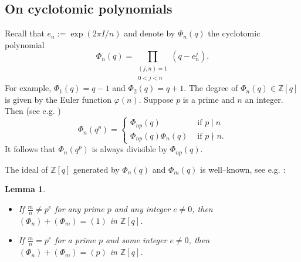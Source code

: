 \documentclass[12pt]{amsart}
\theoremstyle{plain}
\newtheorem{lemma}[Thm]{Lemma}
\theoremstyle{definition}
\def\BZ{\mathbb Z}
\def\BQ{\mathbb Q}
\def\Z{\BZ}
\def\Q{\BQ}
\begin{document}
\subsection{On cyclotomic polynomials}
Recall that $e_n := \exp(2\pi I/n)$
and denote by
$\Phi_n(q)$ the cyclotomic polynomial
\[
\Phi_n(q) = \prod_{\substack{(j,n)=1\\0<j<n}} (q - e_n^j).
\]
For example, $\Phi_1(q)=q-1$ and $\Phi_2(q)=q+1$.
The degree of $\Phi_n(q)\in \Z[q]$ is given by the Euler function $\varphi(n)$.
Suppose $p$ is a prime and $n$ an integer. Then (see e.g. \cite{Na})
\begin{equation} \Phi_n(q^p)= \begin{cases}    \Phi_{np}(q)  & \text{ if } p \mid n \\
\Phi_{np}(q) \Phi_n(q)  & \text{ if } p \nmid n.
\end{cases}
\end{equation}
It follows that  $\Phi_n(q^p)$ is always divisible by $\Phi_{np}(q)$.

The ideal of $\Z[q]$ generated by $\Phi_n(q)$ and $\Phi_m(q)$ is well--known,
see e.g. \cite[Lemma 5.4]{Le}:


\begin{lemma}$\text{ }$
\begin{itemize}
\item[(a)] If $\frac{m}{n} \neq p^e$ for any  prime $p$ and any integer $e\neq 0$, then
$(\Phi_n)+ (\Phi_m)=(1)$ in $\Z[q]$.

\item[(b)] If $\frac{m}{n} = p^e$ for a prime $p$ and some integer $e \neq 0$, then $(\Phi_n)+ (\Phi_m)=(p)$ in $\Z[q]$.
\label{0911}
\end{itemize}
\end{lemma}



%
\end{document}
